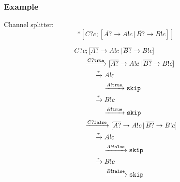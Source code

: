 \documentclass[compress]{beamer}
\begin{document}
\begin{frame}
    \frametitle{Example}
    Channel splitter:
    {\small $$*[C?c; [\overline{A?} \rightarrow A!c \, | \, \overline{B?} \rightarrow B!c]]$$}
\end{frame}
\begin{frame}
    \small
    \begin{align*}
        & C?c; [\overline{A?} \rightarrow A!c \, | \, \overline{B?} \rightarrow B!c] \\
        & \hspace{0.5cm} \xrightarrow{C?\mathtt{true}} [\overline{A?} \rightarrow A!c \, | \, \overline{B?} \rightarrow B!c] \\
        & \hspace{1.0cm} \xrightarrow{\tau} A!c \\
        & \hspace{1.5cm} \xrightarrow{A!\mathtt{true}} \mathtt{skip} \\
        & \hspace{1.0cm} \xrightarrow{\tau} B!c \\
        & \hspace{1.5cm} \xrightarrow{B!\mathtt{true}} \mathtt{skip} \\
        & \hspace{0.5cm} \xrightarrow{C?\mathtt{false}} [\overline{A?} \rightarrow A!c \, | \, \overline{B?} \rightarrow B!c] \\
        & \hspace{1.0cm} \xrightarrow{\tau} A!c \\
        & \hspace{1.5cm} \xrightarrow{A!\mathtt{false}} \mathtt{skip} \\
        & \hspace{1.0cm} \xrightarrow{\tau} B!c \\
        & \hspace{1.5cm} \xrightarrow{B!\mathtt{false}} \mathtt{skip}
    \end{align*}
\end{frame}
\end{document}
